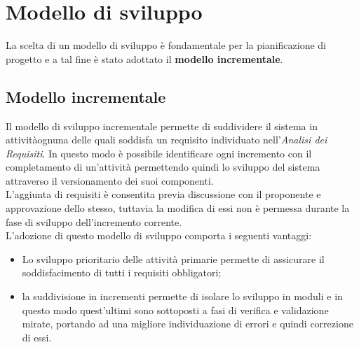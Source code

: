 \section{Modello di sviluppo}
La scelta di un modello di sviluppo è fondamentale per la pianificazione di 
progetto e a tal fine è stato adottato il \textbf{modello incrementale}.

\subsection{Modello incrementale}
Il modello di sviluppo incrementale permette di suddividere il sistema in 
attività\glosp ognuna delle quali soddisfa un requisito\glosp 
individuato nell'\textit{Analisi dei Requisiti}. In questo modo è possibile 
identificare ogni incremento con il completamento di un'attività permettendo 
quindi lo sviluppo del sistema attraverso il versionamento dei suoi componenti. 
\\
L'aggiunta di requisiti è consentita previa discussione con il proponente e 
approvazione dello stesso, tuttavia la modifica di essi non è permessa 
durante la fase di sviluppo dell'incremento corrente.\\
L'adozione di questo modello di sviluppo comporta i seguenti vantaggi:
\begin{itemize}
	\item Lo sviluppo prioritario delle attività primarie permette di 
	assicurare il soddisfacimento di tutti i requisiti obbligatori;
	\item la suddivisione in incrementi permette di isolare lo sviluppo in 
	moduli e in questo modo quest'ultimi sono sottoposti a fasi di verifica e 
	validazione mirate, portando ad una migliore individuazione di errori e 
	quindi correzione di essi.
\end{itemize}

